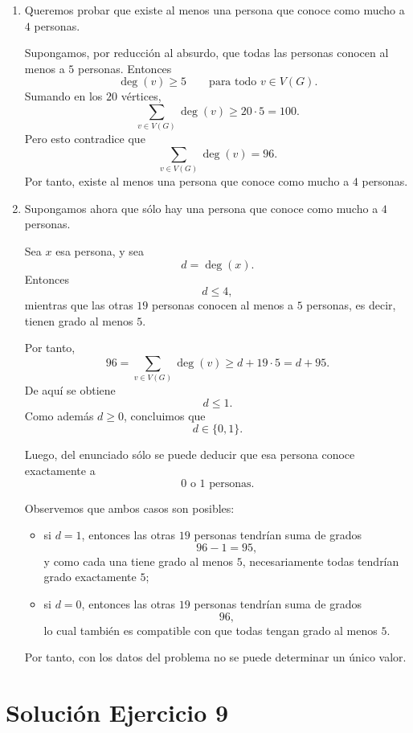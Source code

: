 \documentclass[12pt]{article}
\begin{document}
\begin{enumerate}
    \item Queremos probar que existe al menos una persona que conoce como mucho a \(4\) personas.

    Supongamos, por reducción al absurdo, que todas las personas conocen al menos a \(5\) personas. Entonces
    \[
    \deg(v)\ge 5 \qquad \text{para todo } v\in V(G).
    \]
    Sumando en los \(20\) vértices,
    \[
    \sum_{v\in V(G)} \deg(v)\ge 20\cdot 5=100.
    \]
    Pero esto contradice que
    \[
    \sum_{v\in V(G)} \deg(v)=96.
    \]
    Por tanto, existe al menos una persona que conoce como mucho a \(4\) personas.

    \item Supongamos ahora que sólo hay una persona que conoce como mucho a \(4\) personas.

    Sea \(x\) esa persona, y sea
    \[
    d=\deg(x).
    \]
    Entonces
    \[
    d\le 4,
    \]
    mientras que las otras \(19\) personas conocen al menos a \(5\) personas, es decir, tienen grado al menos \(5\).

    Por tanto,
    \[
    96=\sum_{v\in V(G)} \deg(v)\ge d+19\cdot 5=d+95.
    \]
    De aquí se obtiene
    \[
    d\le 1.
    \]
    Como además \(d\ge 0\), concluimos que
    \[
    d\in\{0,1\}.
    \]

    Luego, del enunciado sólo se puede deducir que esa persona conoce exactamente a
    \[
    \boxed{0 \text{ o } 1 \text{ personas}.}
    \]

    \medskip

    Observemos que ambos casos son posibles:
    \begin{itemize}
        \item si \(d=1\), entonces las otras \(19\) personas tendrían suma de grados
        \[
        96-1=95,
        \]
        y como cada una tiene grado al menos \(5\), necesariamente todas tendrían grado exactamente \(5\);

        \item si \(d=0\), entonces las otras \(19\) personas tendrían suma de grados
        \[
        96,
        \]
        lo cual también es compatible con que todas tengan grado al menos \(5\).
    \end{itemize}

    Por tanto, con los datos del problema no se puede determinar un único valor.
\end{enumerate}

\section*{Solución Ejercicio 9}
\end{document}
